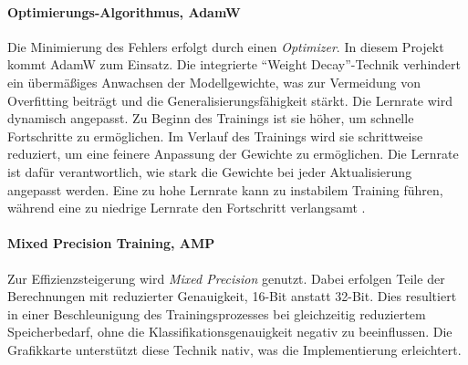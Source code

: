 \paragraph{Optimierungs-Algorithmus, AdamW}
Die Minimierung des Fehlers erfolgt durch einen \emph{Optimizer}. In diesem Projekt kommt AdamW zum Einsatz. Die integrierte "`Weight Decay"'-Technik verhindert ein übermäßiges Anwachsen der Modellgewichte, was zur Vermeidung von Overfitting beiträgt und die Generalisierungsfähigkeit stärkt. Die Lernrate wird dynamisch angepasst. Zu Beginn des Trainings ist sie höher, um schnelle Fortschritte zu ermöglichen. Im Verlauf des Trainings wird sie schrittweise reduziert, um eine feinere Anpassung der Gewichte zu ermöglichen. Die Lernrate ist dafür verantwortlich, wie stark die Gewichte bei jeder Aktualisierung angepasst werden. Eine zu hohe Lernrate kann zu instabilem Training führen, während eine zu niedrige Lernrate den Fortschritt verlangsamt \cite[Kapitel 8.5]{goodfellow2016}.

\paragraph{Mixed Precision Training, AMP}
Zur Effizienzsteigerung wird \emph{Mixed Precision} genutzt. Dabei erfolgen Teile der Berechnungen mit reduzierter Genauigkeit, 16-Bit anstatt 32-Bit. Dies resultiert in einer Beschleunigung des Trainingsprozesses bei gleichzeitig reduziertem Speicherbedarf, ohne die Klassifikationsgenauigkeit negativ zu beeinflussen. Die Grafikkarte unterstützt diese Technik nativ, was die Implementierung erleichtert.
